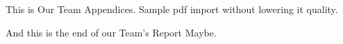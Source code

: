 This is Our Team Appendices. Sample pdf import without lowering it quality.

\noindent And this is the end of our Team's Report Maybe.
